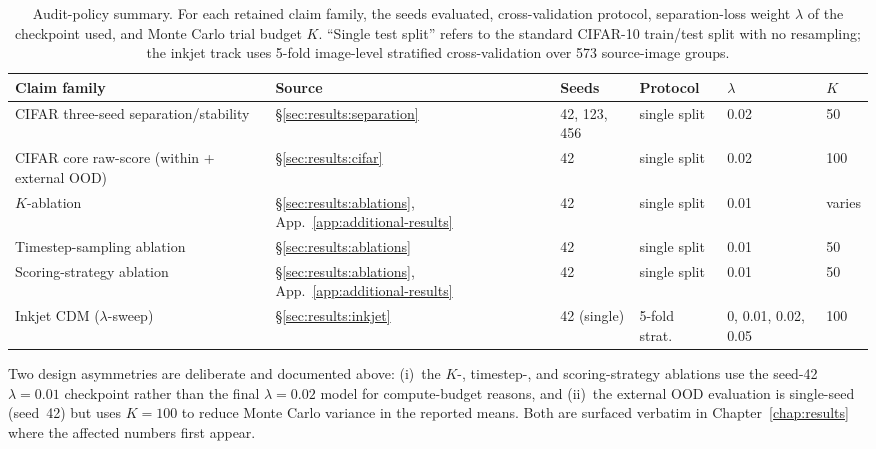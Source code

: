 \begin{table}[htbp]
  \centering
  \caption{Audit-policy summary. For each retained claim family, the seeds evaluated, cross-validation protocol, separation-loss weight $\lambda$ of the checkpoint used, and Monte Carlo trial budget $K$. ``Single test split'' refers to the standard CIFAR-10 train/test split with no resampling; the inkjet track uses 5-fold image-level stratified cross-validation over 573 source-image groups.}
  \label{tab:appC:audit-summary}
  \footnotesize
  \begin{tabularx}{\textwidth}{@{}p{3.8cm}p{1.8cm}p{2.0cm}p{1.3cm}p{0.8cm}X@{}}
    \toprule
    Claim family & Source & Seeds & Protocol & $\lambda$ & $K$ \\
    \midrule
    CIFAR three-seed separation/stability & §\ref{sec:results:separation}     & 42, 123, 456 & single split & 0.02 & 50  \\
    CIFAR core raw-score (within + external OOD) & §\ref{sec:results:cifar}          & 42           & single split & 0.02 & 100 \\
    $K$-ablation                   & §\ref{sec:results:ablations}, App.~\ref{app:additional-results} & 42 & single split & 0.01 & varies \\
    Timestep-sampling ablation     & §\ref{sec:results:ablations}      & 42           & single split & 0.01 & 50  \\
    Scoring-strategy ablation      & §\ref{sec:results:ablations}, App.~\ref{app:additional-results} & 42 & single split & 0.01 & 50 \\
    Inkjet CDM (\(\lambda\)-sweep) & §\ref{sec:results:inkjet}         & 42 (single)          & 5-fold strat.\ & 0, 0.01, 0.02, 0.05 & 100 \\
    \bottomrule
  \end{tabularx}
\end{table}

Two design asymmetries are deliberate and documented above: (i)~the $K$-, timestep-, and scoring-strategy ablations use the seed-42 $\lambda{=}0.01$ checkpoint rather than the final $\lambda{=}0.02$ model for compute-budget reasons, and (ii)~the external OOD evaluation is single-seed (seed~42) but uses $K{=}100$ to reduce Monte Carlo variance in the reported means. Both are surfaced verbatim in Chapter~\ref{chap:results} where the affected numbers first appear.
